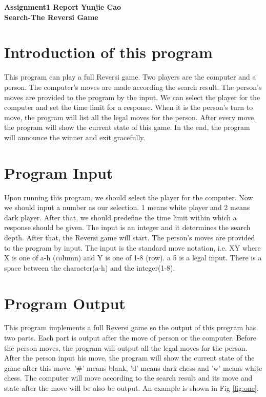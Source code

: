\documentclass[a4paper, 11pt]{article}
\begin{document}
\noindent
\large\textbf{Assignment1 Report} \hfill \textbf{Yunjie Cao} \\

\large\textbf{Search-The Reversi Game}

\section*{Introduction of this program}
This program can play a full Reversi game. Two players are the computer and a person. The computer's moves are made according the search result. The person's moves are provided to the program by the input. We can select the player for the computer and set the time limit for a response. When it is the person's turn to move, the program will list all the legal moves for the person. After every move, the program will show the current state of this game. In the end, the program will announce the winner and exit gracefully.

\section*{Program Input}
Upon running this program, we should select the player for the computer. Now we should input a number as our selection. 1 means white player and 2 means dark player. After that, we should predefine the time limit within which a response should be given. The input is an integer and it determines the search depth. After that, the Reversi game will start. The person's moves are provided to the program by input. The input is the standard move notation, i.e. XY where X is one of a-h (column) and Y is one of 1-8 (row). a 5 is a legal input. There is a space between the character(a-h) and the integer(1-8).

\section*{Program Output}

This program implements a full Reversi game so the output of this program has two parts. Each part is output after the move of person or the computer. Before the person moves, the program will output all the legal moves for the person. After the person input his move, the program will show the current state of the game after this move. '\#' means blank, 'd' means dark chess and 'w' means white chess. The computer will move according to the search result and its move and state after the move will be also be output. An example is shown in Fig \ref{fig:one}.
\end{document}
